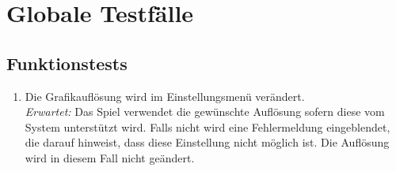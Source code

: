 \chapter{Globale Testfälle}

\renewcommand{\theenumi}{/T\_\arabic{enumi}0/}
\renewcommand{\labelenumi}{\theenumi}

\section{Funktionstests}

\begin{enumerate}
\item Die Grafikauflösung wird im Einstellungsmenü verändert.\\
	 	\textit{Erwartet:} Das Spiel verwendet die gewünschte Auflösung sofern diese vom System unterstützt wird. Falls nicht wird eine Fehlermeldung eingeblendet, die darauf hinweist, dass diese Einstellung nicht möglich ist. Die Auflösung wird in diesem Fall nicht geändert.
	 	

\end{enumerate}
